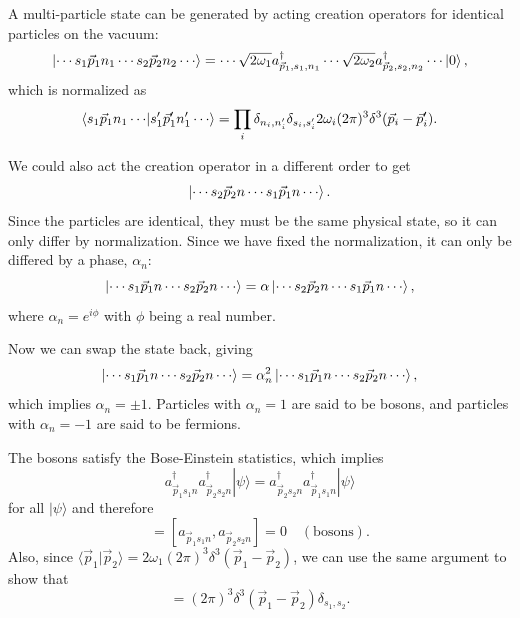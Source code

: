 \documentclass[11pt]{article}
\theoremstyle{definition}
\begin{document}
A multi-particle state can be generated by acting  creation operators for identical particles on the vacuum:
\begin{equation}
    \ket{\cdots s_1\vec{p}_1n_1 \cdots s_2\vec{p}_2n_2 \cdots } = \cdots \sqrt{2\omega_1}a_{\vec{p}_1,s_1,n_1}^\dagger \cdots \sqrt{2\omega_2}a_{\vec{p}_2,s_2,n_2}^\dagger\cdots \ket{0},
\end{equation}
which is normalized as 
\begin{equation}
    \braket{s_1\vec{p}_1n_1 \cdots}{s_1'\vec{p}_1'n_1' \cdots} = \prod_i\delta_{n_i,n_i'}\delta_{s_i,s_i'}2\omega_i(2\pi)^3\delta^3(\vec{p}_i-\vec{p}_i').
\end{equation}

We could also act the creation operator in a different order to get
\begin{equation}
    \ket{\cdots s_2\vec{p}_2n \cdots s_1\vec{p}_1n \cdots}.
\end{equation}
Since the particles are identical, they must be the same physical state, so it can only differ by normalization. Since we have fixed the normalization, it can only be differed by a phase, $\alpha_n$:
\begin{equation}
    \ket{\cdots s_1\vec{p}_1n \cdots s_2\vec{p}_2n\cdots } = \alpha\ket{\cdots s_2\vec{p}_2n \cdots s_1\vec{p}_1n \cdots},
\end{equation}
where $\alpha_n = e^{i\phi}$ with $\phi$ being a real number.

Now we can swap the state back, giving 
\begin{equation}
    \ket{\cdots s_1\vec{p}_1n \cdots s_2\vec{p}_2n \cdots } = \alpha_n^2\ket{\cdots s_1\vec{p}_1n \cdots s_2\vec{p}_2n \cdots},
\end{equation}
which implies $\alpha_n = \pm 1$. Particles with $\alpha_n= 1$ are said to be bosons, and particles with $\alpha_n= -1$ are said to be fermions.

The bosons satisfy the Bose-Einstein statistics, which implies
\begin{equation}
a^{\dagger}_{\vec{p}_{1}s_{1}n}a^{\dagger}_{\vec{p}_{2}s_{2}n}|\psi\rangle=a^{\dagger}_{\vec{p}_{2}s_{2}n}a^{\dagger}_{\vec{p}_{1}s_{1}n}|\psi\rangle
\end{equation}
for all \(|\psi\rangle\) and therefore
\begin{equation}
[a^{\dagger}_{\vec{p}_{1}s_{1}n},a^{\dagger}_{\vec{p}_{2}s_{2}n}]=[a_{\vec{p}_{1}s_{1}n},a_{\vec{p}_{2}s_{2}n}]=0\quad(\text{bosons}).
\end{equation}
Also, since \(\langle\vec{p}_{1}|\vec{p}_{2}\rangle=2\omega_{1}(2\pi)^{3}\delta^{3}(\vec{p}_{1}-\vec{p}_{2})\), we can use the same argument to show that
\begin{equation}
[a_{\vec{p}_{1}s_{1}n},a^{\dagger}_{\vec{p}_{2}s_{2}n}]=(2\pi)^{3}\delta^{3}(\vec{p}_{1}-\vec{p}_{2})\delta_{s_{1},s_{2}}.
\end{equation}
\end{document}
